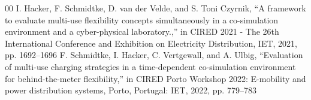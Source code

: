 \documentclass[conference,a4paper]{IEEEtran}
\begin{document}
\begin{thebibliography}{00}
 I. Hacker, F. Schmidtke, D. van der Velde, and S. Toni Czyrnik, “A framework to evaluate multi-use flexibility concepts simultaneously in a co-simulation environment and a cyber-physical laboratory.,” in CIRED 2021 - The 26th International Conference and Exhibition on Electricity Distribution, IET, 2021, pp. 1692–1696
 F. Schmidtke, I. Hacker, C. Vertgewall, and A. Ulbig, “Evaluation of multi-use charging strategies in a time-dependent co-simulation environment for behind-the-meter flexibility,” in CIRED Porto Workshop 2022: E-mobility and power distribution systems, Porto, Portugal: IET, 2022, pp. 779–783

\end{thebibliography}
\end{document}

